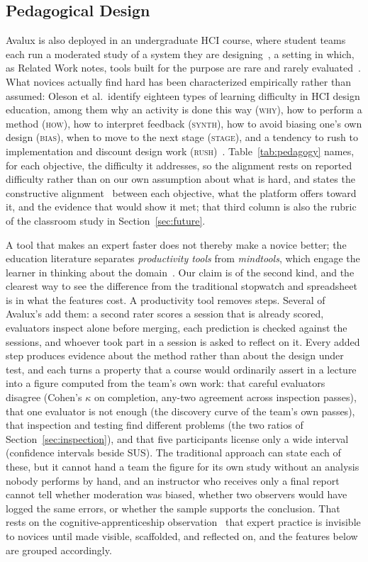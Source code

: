 \documentclass[conference]{IEEEtran}
\begin{document}
\subsection{Pedagogical Design}
\label{sec:pedagogy}
Avalux is also deployed in an undergraduate HCI course, where student
teams each run a moderated study of a system they are
designing~\cite{churchill2013teaching}, a setting in which, as Related Work
notes, tools built for the purpose are rare and rarely
evaluated~\cite{lima2019tools}. What novices actually find hard has been
characterized empirically rather than assumed: Oleson et al.\ identify
eighteen types of learning difficulty in HCI design education, among them
why an activity is done this way (\textsc{why}), how to perform a method
(\textsc{how}), how to interpret feedback (\textsc{synth}), how to avoid
biasing one's own design (\textsc{bias}), when to move to the next stage
(\textsc{stage}), and a tendency to rush to implementation and discount
design work (\textsc{rush})~\cite{oleson2020difficulties}.
Table~\ref{tab:pedagogy} names, for each objective, the difficulty it
addresses, so the alignment rests on reported difficulty rather than on our
own assumption about what is hard, and states the constructive
alignment~\cite{biggs1996alignment} between each objective, what the
platform offers toward it, and the evidence that would show it met; that
third column is also the rubric of the classroom study in
Section~\ref{sec:future}.

A tool that makes an expert faster does not thereby make a novice better;
the education literature separates \emph{productivity tools} from
\emph{mindtools}, which engage the learner in thinking about the
domain~\cite{jonassen2000mindtools}. Our claim is of the second kind, and
the clearest way to see the difference from the traditional stopwatch and
spreadsheet is in what the features cost. A productivity tool removes
steps. Several of Avalux's add them: a second rater scores a session that
is already scored, evaluators inspect alone before merging, each prediction
is checked against the sessions, and whoever took part in a session is
asked to reflect on it. Every added step produces evidence about the method
rather than about the design under test, and each turns a property that a
course would ordinarily assert in a lecture into a figure computed from the
team's own work: that careful evaluators disagree (Cohen's $\kappa$ on
completion, any-two agreement across inspection passes), that one
evaluator is not enough (the discovery curve of the team's own passes),
that inspection and testing find different problems (the two ratios of
Section~\ref{sec:inspection}), and that five participants license only a
wide interval (confidence intervals beside SUS). The traditional approach
can state each of these, but it cannot hand a team the figure for its own
study without an analysis nobody performs by hand, and an instructor who
receives only a final report cannot tell whether moderation was biased,
whether two observers would have logged the same errors, or whether the
sample supports the conclusion. That rests on the cognitive-apprenticeship
observation~\cite{collins1989cognitive} that expert practice is invisible
to novices until made visible, scaffolded, and reflected on, and the
features below are grouped accordingly.
\end{document}
